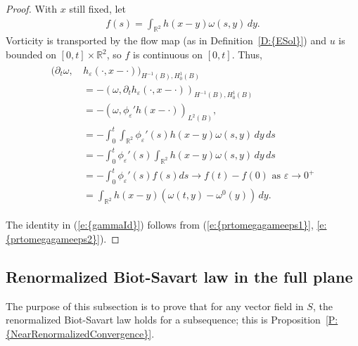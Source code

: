 \documentclass[reqno,openright,11pt,twoside]{amsart}
\theoremstyle{definition}
\numberwithin{equation}{section}
\begin{document}
\begin{proof}
	With $x$ still fixed, let
	\begin{align*}
		f(s)
			= \int_{{\ensuremath{{\ensuremath{\mathbb{{R}}}}}}^2} h(x - y) \omega(s, y) \, dy.
	\end{align*}
	Vorticity is transported by the flow map (as in {Definition~\ref{D:{ESol}}})
	and $u$ is bounded on $[0, t] \times {\ensuremath{{\ensuremath{\mathbb{{R}}}}}}^2$, so
	$f$ is continuous on $[0, t]$. Thus,
	\begin{align}\label{e:prtomegagameeps2}
		\begin{split}
		({\ensuremath{\partial}}_t \omega, \, &h_{\ensuremath{\varepsilon}}(\cdot, x - \cdot))
		        _{H^{-1}(B), H_0^1(B)} \\
			&= - (\omega, {\ensuremath{\partial}}_t h_{\ensuremath{\varepsilon}}(\cdot, x - \cdot))
	                _{H^{-1}(B), H_0^1(B)} \\
			&= - (\omega, \phi_{\ensuremath{\varepsilon}}' h(x - \cdot))_{L^2(B)}, \\
			&= - \int_0^t \int_{{\ensuremath{{\ensuremath{\mathbb{{R}}}}}}^2} \phi_{\ensuremath{\varepsilon}}'(s) h(x - y)
			    \omega(s, y) \, dy \, ds \\
			&= - \int_0^t \phi_{\ensuremath{\varepsilon}}'(s) \int_{{\ensuremath{{\ensuremath{\mathbb{{R}}}}}}^2} h(x - y)
			    \omega(s, y) \, dy \, ds \\
			&= - \int_0^t \phi_{\ensuremath{\varepsilon}}'(s) f(s) ds \to f(t) - f(0)
			    \text{ as } {\ensuremath{\varepsilon}} \to 0^+ \\
			&= \int_{{\ensuremath{{\ensuremath{\mathbb{{R}}}}}}^2} h(x - y)
			    (\omega(t, y) - \omega^0(y)) \, dy.
		\end{split}
	\end{align}
	
	The identity in {(\ref{e:{gammaId}})} follows from {(\ref{e:{prtomegagameeps1}}, \ref{e:{prtomegagameeps2}})}.
\end{proof}

\subsection{Renormalized Biot-Savart law in the full plane}\label{S:BSLawR2}

\noindent The purpose of this subsection is to prove that for any vector field in $S$, the renormalized Biot-Savart law holds for a subsequence; this is {Proposition~\ref{P:{NearRenormalizedConvergence}}}.
\end{document}
